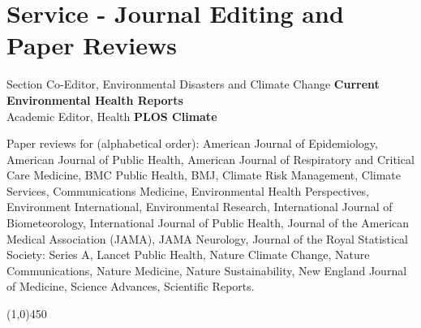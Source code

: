 \section*{Service - Journal Editing and Paper Reviews}

\noindent Section Co-Editor, Environmental Disasters and Climate Change \hfill \textbf{Current Environmental Health Reports}\\
\noindent Academic Editor, Health \hfill \textbf{PLOS Climate} \medskip

\noindent Paper reviews for (alphabetical order): American Journal of Epidemiology, American Journal of Public Health, American Journal of Respiratory and Critical Care Medicine, BMC Public Health, BMJ, Climate Risk Management, Climate Services, Communications Medicine, Environmental Health Perspectives, Environment International, Environmental Research, International Journal of Biometeorology, International Journal of Public Health, Journal of the American Medical Association (JAMA), JAMA Neurology, Journal of the Royal Statistical Society: Series A, Lancet Public Health, Nature Climate Change, Nature Communications, Nature Medicine, Nature Sustainability, New England Journal of Medicine, Science Advances, Scientific Reports.

\begin{center} \line(1,0){450} \end{center}